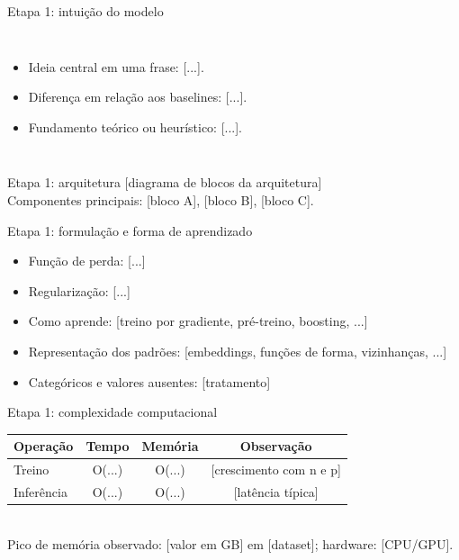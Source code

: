 \documentclass[aspectratio=169,11pt]{beamer}
\begin{document}
\begin{frame}{Etapa 1: intuição do modelo}
    \begin{columns}[T,onlytextwidth]
        \begin{itemize}
            \item Ideia central em uma frase: [...].
            \item Diferença em relação aos baselines: [...].
            \item Fundamento teórico ou heurístico: [...].
        \end{itemize}
    \end{columns}
\end{frame}

\begin{frame}{Etapa 1: arquitetura}
    \centering
    [diagrama de blocos da arquitetura]
    \\[0.4em]
    \footnotesize Componentes principais: [bloco A], [bloco B], [bloco C].
\end{frame}

\begin{frame}{Etapa 1: formulação e forma de aprendizado}
    \begin{itemize}
        \item Função de perda: [...]
        \item Regularização: [...]
        \item Como aprende: [treino por gradiente, pré-treino, boosting, ...]
        \item Representação dos padrões: [embeddings, funções de forma, vizinhanças, ...]
        \item Categóricos e valores ausentes: [tratamento]
    \end{itemize}
\end{frame}

\begin{frame}{Etapa 1: complexidade computacional}
    \footnotesize
    \begin{tabular}{l c c c}
        \toprule
        \textbf{Operação} & \textbf{Tempo} & \textbf{Memória} & \textbf{Observação} \\
        \midrule
        Treino     & O(...) & O(...) & [crescimento com n e p] \\
        Inferência & O(...) & O(...) & [latência típica] \\
        \bottomrule
    \end{tabular}
    \vspace{0.5em}
    \\
    Pico de memória observado: [valor em GB] em [dataset]; hardware: [CPU/GPU].
\end{frame}
\end{document}
